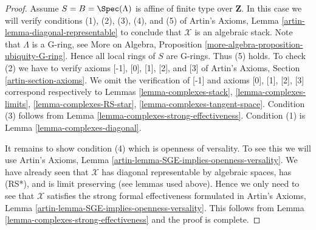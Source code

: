 \begin{proof}
\medskip\noindent
Assume $S = B = \Spec(\Lambda)$ is affine of finite type over $\mathbf{Z}$.
In this case we will verify conditions (1), (2), (3), (4), and (5) of
Artin's Axioms, Lemma \ref{artin-lemma-diagonal-representable}
to conclude that $\mathcal{X}$ is an algebraic stack.
Note that $\Lambda$ is a G-ring, see
More on Algebra, Proposition \ref{more-algebra-proposition-ubiquity-G-ring}.
Hence all local rings of $S$ are G-rings. Thus (5) holds.
To check (2) we have to verify axioms [-1], [0], [1], [2], and [3]
of Artin's Axioms, Section \ref{artin-section-axioms}.
We omit the verification of [-1] and axioms
[0], [1], [2], [3] correspond respectively to
Lemmas \ref{lemma-complexes-stack},
\ref{lemma-complexes-limits},
\ref{lemma-complexes-RS-star},
\ref{lemma-complexes-tangent-space}.
Condition (3) follows from Lemma \ref{lemma-complexes-strong-effectiveness}.
Condition (1) is Lemma \ref{lemma-complexes-diagonal}.

\medskip\noindent
It remains to show condition (4) which is openness of versality.
To see this we will use
Artin's Axioms, Lemma \ref{artin-lemma-SGE-implies-openness-versality}.
We have already seen that $\mathcal{X}$ has diagonal
representable by algebraic spaces, has (RS*), and is limit preserving
(see lemmas used above).
Hence we only need to see that $\mathcal{X}$ satisfies the strong
formal effectiveness formulated in
Artin's Axioms, Lemma \ref{artin-lemma-SGE-implies-openness-versality}.
This follows from Lemma \ref{lemma-complexes-strong-effectiveness}
and the proof is complete.
\end{proof}

















